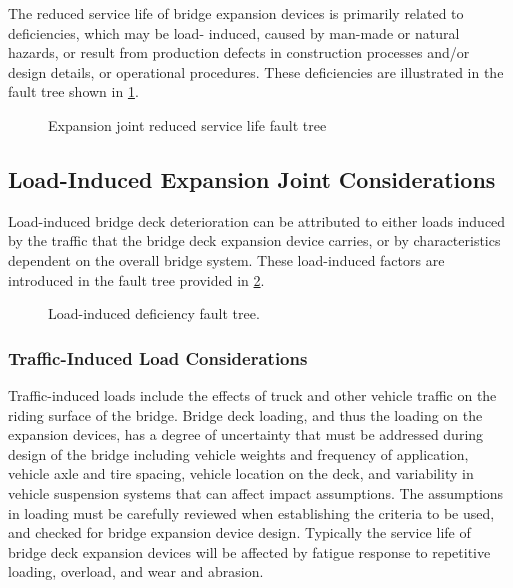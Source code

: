 The reduced service life of bridge expansion devices is primarily related to deficiencies, which may be load-
induced, caused by man-made or natural hazards, or result from production defects in construction processes and/or
design details, or operational procedures. These deficiencies are illustrated in the fault tree shown in \cref{fig:faulttree-expansion-joint}.

\begin{figure}
  \caption{Expansion joint reduced service life fault tree}
  \label{fig:faulttree-expansion-joint}
\end{figure}

\subsection{Load-Induced Expansion Joint Considerations}
Load-induced bridge deck deterioration can be attributed to either loads induced by the traffic that the bridge
deck expansion device carries, or by characteristics dependent on the overall bridge system. These load-induced
factors are introduced in the fault tree provided in \cref{fig:faulttree-expansion-joint-load-induced}.

\begin{figure}
  \caption{Load-induced deficiency fault tree.}
  \label{fig:faulttree-expansion-joint-load-induced}
\end{figure}

\subsubsection{Traffic-Induced Load Considerations}
Traffic-induced loads include the effects of truck and other vehicle traffic on the riding surface of the bridge.
Bridge deck loading, and thus the loading on the expansion devices, has a degree of uncertainty that must be
addressed during design of the bridge including vehicle weights and frequency of application, vehicle axle and tire
spacing, vehicle location on the deck, and variability in vehicle suspension systems that can affect impact
assumptions. The assumptions in loading must be carefully reviewed when establishing the criteria to be used, and checked for bridge expansion device design. Typically the service life of bridge deck expansion devices will be
affected by fatigue response to repetitive loading, overload, and wear and abrasion.

